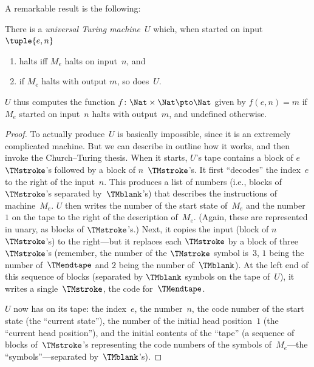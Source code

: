 \documentclass[../../../include/open-logic-section]{subfiles}
\begin{document}
A remarkable result is the following:

\begin{thm} There is a \emph{universal
  Turing machine}~$U$ which, when started on input $\tuple{e,n}$ 
  \begin{enumerate}
    \item halts iff $M_e$ halts on input~$n$, and
    \item if $M_e$ halts with output $m$, so does~$U$.
  \end{enumerate}
  $U$ thus computes the function $f\colon \Nat \times \Nat \pto \Nat$
  given by $f(e,n) = m$ if $M_e$ started on input~$n$ halts with
  output~$m$, and undefined otherwise.
\end{thm}

\begin{proof}
  To actually produce~$U$ is basically impossible, since it is an
  extremely complicated machine. But we can describe in outline how it
  works, and then invoke the Church--Turing thesis.  When it starts,
  $U$'s tape contains a block of $e$ $\TMstroke$'s followed by a block
  of $n$~$\TMstroke$'s. It first ``decodes'' the index~$e$ to the
  right of the input~$n$. This produces a list of numbers (i.e.,
  blocks of $\TMstroke$'s separated by~$\TMblank$'s) that describes
  the instructions of machine~$M_e$. $U$ then writes the number of the
  start state of~$M_e$ and the number~$1$ on the tape to the right of
  the description of~$M_e$. (Again, these are represented in unary, as
  blocks of $\TMstroke$'s.) Next, it copies the input (block of
  $n$~$\TMstroke$'s) to the right---but it replaces each $\TMstroke$
  by a block of three $\TMstroke$'s (remember, the number of the $\TMstroke$
  symbol is~$3$, $1$ being the number of~$\TMendtape$ and $2$ being
  the number of~$\TMblank$). At the left end of this sequence of blocks
  (separated by $\TMblank$ symbols on the tape of~$U$), it writes a
  single~$\TMstroke$, the code for~$\TMendtape$.

  $U$ now has on its tape: the index~$e$, the number~$n$, the code
  number of the start state (the ``current state''), the number of the
  initial head position~$1$ (the ``current head position''), and the
  initial contents of the ``tape'' (a sequence of blocks
  of~$\TMstroke$'s representing the code numbers of the symbols
  of~$M_e$---the ``symbols''---separated by~$\TMblank$'s).


\end{proof}
\end{document}
